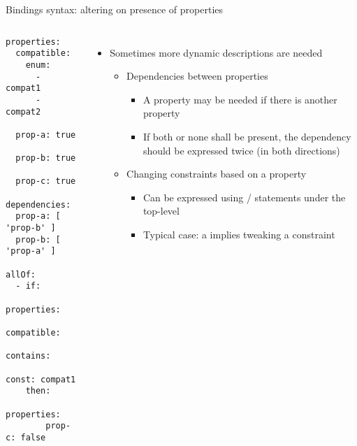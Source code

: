 \begin{frame}[fragile]{Bindings syntax: altering on presence of properties}
  \begin{columns}
    \begin{block}{}
      {\fontsize{5}{6}\selectfont
\begin{verbatim}
properties:
  compatible:
    enum:
      - compat1
      - compat2

  prop-a: true

  prop-b: true

  prop-c: true

dependencies:
  prop-a: [ 'prop-b' ]
  prop-b: [ 'prop-a' ]

allOf:
  - if:
      properties:
        compatible:
          contains:
            const: compat1
    then:
      properties:
        prop-c: false
\end{verbatim}
      }
    \end{block}
    \begin{itemize}
    \item Sometimes more dynamic descriptions are needed
      \begin{itemize}
      \item Dependencies between properties
        \begin{itemize}
        \item A property may be needed if there is another property
        \item If both or none shall be present, the dependency should be
          expressed twice (in both directions)
        \end{itemize}
      \item Changing constraints based on a property
        \begin{itemize}
        \item Can be expressed using / statements
          under the top-level 
        \item Typical case: a  implies tweaking a
          constraint
        \end{itemize}
      \end{itemize}
    \end{itemize}
  \end{columns}
\end{frame}

